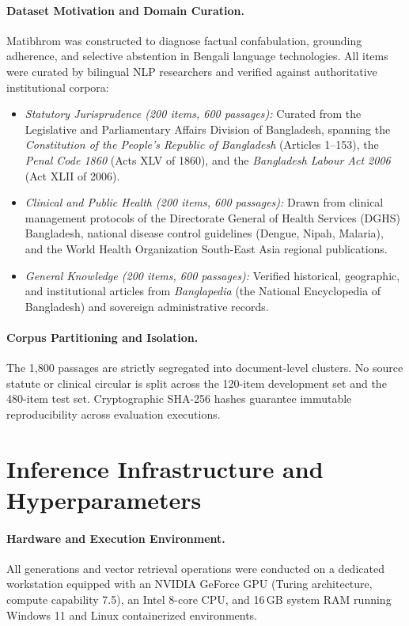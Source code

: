 \documentclass[11pt,a4paper,twocolumn]{article}
\begin{document}
\paragraph{Dataset Motivation and Domain Curation.} Matibhrom was constructed to diagnose factual confabulation, grounding adherence, and selective abstention in Bengali language technologies. All items were curated by bilingual NLP researchers and verified against authoritative institutional corpora:
\begin{itemize}[leftmargin=*]
    \item \emph{Statutory Jurisprudence (200 items, 600 passages):} Curated from the Legislative and Parliamentary Affairs Division of Bangladesh, spanning the \emph{Constitution of the People's Republic of Bangladesh} (Articles 1--153), the \emph{Penal Code 1860} (Acts XLV of 1860), and the \emph{Bangladesh Labour Act 2006} (Act XLII of 2006).
    \item \emph{Clinical and Public Health (200 items, 600 passages):} Drawn from clinical management protocols of the Directorate General of Health Services (DGHS) Bangladesh, national disease control guidelines (Dengue, Nipah, Malaria), and the World Health Organization South-East Asia regional publications.
    \item \emph{General Knowledge (200 items, 600 passages):} Verified historical, geographic, and institutional articles from \emph{Banglapedia} (the National Encyclopedia of Bangladesh) and sovereign administrative records.
\end{itemize}

\paragraph{Corpus Partitioning and Isolation.} The 1,800 passages are strictly segregated into document-level clusters. No source statute or clinical circular is split across the 120-item development set and the 480-item test set. Cryptographic SHA-256 hashes guarantee immutable reproducibility across evaluation executions.

\section{Inference Infrastructure and Hyperparameters}
\label{sec:appendix_compute}

\paragraph{Hardware and Execution Environment.} All generations and vector retrieval operations were conducted on a dedicated workstation equipped with an NVIDIA GeForce GPU (Turing architecture, compute capability 7.5), an Intel 8-core CPU, and 16\,GB system RAM running Windows 11 and Linux containerized environments. 
\end{document}
